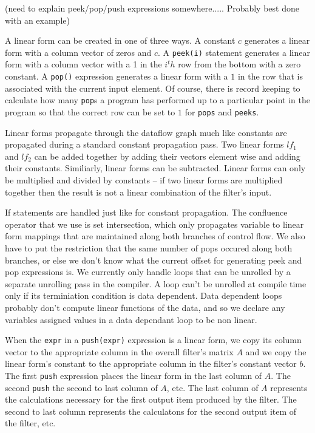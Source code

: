 (need to explain peek/pop/push expressions somewhere.....
 Probably best done with an example)

A linear form can be created in one of three ways. A constant $c$ generates a linear
form with a column vector of zeros and $c$. A {\tt peek(i)} statement generates a linear form
with a column vector with a 1 in the $i^th$ row from the bottom with a zero constant. A
{\tt pop()} expression generates a linear form with a $1$ in the row that is associated with 
the current input element. Of course, there is record keeping to calculate how many {\tt pop}s
a program has performed up to a particular point in the program so that the correct
row can be set to $1$ for {\tt pops} and {\tt peeks}.

Linear forms propagate through the dataflow graph much like constants are propagated
during a standard constant propagation pass. Two linear forms $lf_{1}$ and $lf_{2}$ can
be added together by adding their vectors element wise and adding their constants. Similiarly, 
linear forms can be subtracted. Linear forms can only be multiplied and divided by constants -- if
two linear forms are multiplied together then the result is not a linear combination of the 
filter's input.

If statements are handled just like for constant propagation. The confluence operator that
we use is set intersection, which only propagates variable to linear form mappings that are
maintained along both branches of control flow. We also have to put the restriction that the
same number of pops occured along both branches, or else we don't know what the current offset
for generating peek and pop expressions is. We currently only handle loops that can be unrolled
by a separate unrolling pass in the compiler. A loop can't be unrolled at compile time only if 
its terminiation condition is data dependent. Data dependent loops probably don't compute linear 
functions of the data, and so we declare any variables assigned values in a data dependant loop
to be non linear.

When the {\tt expr} in a {\tt push(expr)} expression is a linear form, we copy its column
vector to the appropriate column in the overall filter's matrix $A$ and we copy the
linear form's constant to the appropriate column in the filter's constant vector $b$.
The first {\tt push} expression places the linear form in the last column of $A$. The second
{\tt push} the second to last column of $A$, etc. The last column of $A$ represents the 
calculations necessary for the first output item produced by the filter. The second to last
column represents the calculatons for the second output item of the filter, etc.

